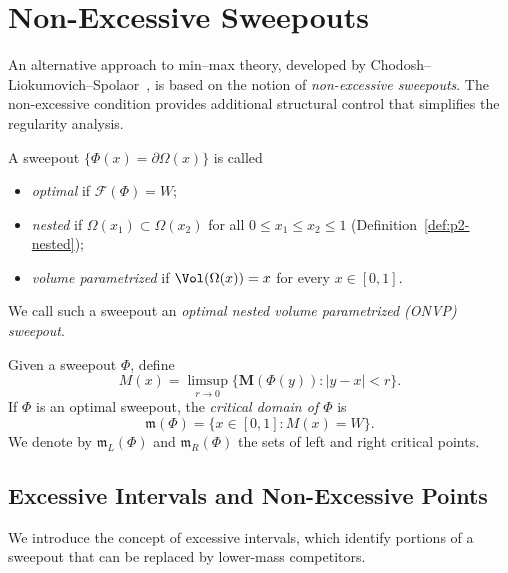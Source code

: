 \section{Non-Excessive Sweepouts}\label{sec:non-excessive-prelim}

An alternative approach to min--max theory, developed by Chodosh--Liokumovich--Spolaor~\cite{CLS22}, is based on the notion of \emph{non-excessive sweepouts}. The non-excessive condition provides additional structural control that simplifies the regularity analysis.

\begin{definition}\label{def:onvp}
A sweepout $\{\Phi(x) = \partial \Omega(x)\}$ is called
\begin{itemize}
    \item \emph{optimal} if $\mathcal{F}(\Phi) = W$;
    \item \emph{nested} if $\Omega(x_1) \subset \Omega(x_2)$ for all $0\leq x_1 \leq x_2\leq 1$ (Definition~\ref{def:p2-nested});
    \item \emph{volume parametrized} if $\Vol(\Omega(x)) = x$ for every $x\in [0,1]$.
\end{itemize}
We call such a sweepout an \emph{optimal nested volume parametrized (ONVP) sweepout}.
\end{definition}

\begin{definition}\label{def:critical-set}
Given a sweepout $\Phi$, define
\[
M(x) = \limsup_{r \to 0} \{\mathbf{M}(\Phi(y)): |y-x| < r\}.
\]
If $\Phi$ is an optimal sweepout, the \emph{critical domain of $\Phi$} is
\[
\mathfrak{m}(\Phi)=\{ x \in [0,1]: M(x) =W \}.
\]
We denote by $\mathfrak{m}_L(\Phi)$ and $\mathfrak{m}_R(\Phi)$ the sets of left and right critical points.
\end{definition}

\subsection{Excessive Intervals and Non-Excessive Points}

We introduce the concept of excessive intervals, which identify portions of a sweepout that can be replaced by lower-mass competitors.


